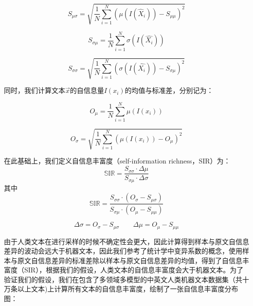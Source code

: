 \documentclass[a4paper]{report}
\begin{document}
\begin{equation}
	S_{\mu\sigma} = \sqrt{\frac{1}{N} \sum_{i=1}^N \left( \mu(I(\hat{X}_i)) - S_{\mu\mu} \right)^2}
\end{equation}

\begin{equation}
	S_{\sigma\mu} = \frac{1}{N} \sum_{i=1}^N \sigma\left(I\left(\hat{X_i}\right)\right)
\end{equation}

\begin{equation}
	S_{\sigma\sigma} = \sqrt{\frac{1}{N} \sum_{i=1}^N \left( \sigma\left(I\left(\hat{X_i}\right)\right) - S_{\sigma\mu} \right)^2}
\end{equation}


同时，我们计算文本$\vec{x}$的自信息量$I(x_i)$的均值与标准差，分别记为：

\begin{equation}
	O_{\mu} = \frac{1}{N} \sum_{i=1}^N \mu(I(x_i))
\end{equation}

\begin{equation}
	O_{\sigma} = \sqrt{\frac{1}{N} \sum_{i=1}^N \left( \mu(I(x_i)) - O_{\mu} \right)^2}
\end{equation}


在此基础上，我们定义自信息丰富度（self-information richness，SIR）为：
\begin{equation}
	\mathbb{SIR}=\frac{S_{\sigma\sigma}\cdot\Delta\mu}{S_{\sigma\mu}\cdot\Delta\sigma}
\end{equation}
其中
\begin{equation}
	\mathbb{SIR}=\frac{S_{\sigma\sigma}\cdot (O_\sigma-S_{\mu\sigma})}{S_{\sigma\mu}\cdot (O_\mu-S_{\mu\mu})}
\end{equation}

\begin{equation}
	\Delta\sigma=O_\sigma-S_{\mu\sigma}\qquad\Delta\mu=O_\mu-S_{\mu\mu}
\end{equation}

由于人类文本在进行采样的时候不确定性会更大，因此计算得到样本与原文自信息差异的波动会远大于机器文本，因此我们参考了统计学中变异系数的概念，使用样本与原文自信息差异的标准差除以样本与原文自信息差异的均值，得到了自信息丰富度（SIR），根据我们的假设，人类文本的自信息丰富度会大于机器文本。为了验证我们的假设，我们在包含了多领域多模型的中英文人类机器文本数据集（共十万条以上文本)上计算所有文本的自信息丰富度，绘制了一张自信息丰富度分布图：
\end{document}
